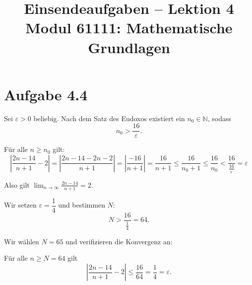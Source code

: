 \documentclass[a4paper,12pt]{article}
\title{Einsendeaufgaben -- Lektion 4\\[0.5em]
\large Modul 61111: Mathematische Grundlagen}
\author{}
\date{}
\begin{document}
\maketitle

\section*{Aufgabe 4.4}

Sei $\varepsilon > 0$ beliebig. Nach dem Satz des Eudoxos existiert ein $n_0 \in \mathbb{N}$, sodass
\[
    n_0 > \frac{16}{\varepsilon}.
\]

F\"{u}r alle $n \geq n_0$ gilt:
\[
    \left| \frac{2n - 14}{n + 1} - 2 \right|
    = \left| \frac{2n - 14 - 2n - 2}{n + 1} \right|
    = \left| \frac{-16}{n + 1} \right|
    = \frac{16}{n + 1}
    \leq \frac{16}{n_0 + 1}
    \leq \frac{16}{n_0}
    < \frac{16}{\frac{16}{\varepsilon}}
    = \varepsilon
\]

Also gilt $\displaystyle\lim_{n \to \infty} \frac{2n - 14}{n + 1} = 2$.

Wir setzen $\varepsilon = \dfrac{1}{4}$ und bestimmen $N$:
\[
    N > \frac{16}{\frac{1}{4}} = 64.
\]

Wir w\"{a}hlen $N = 65$ und verifizieren die Konvergenz an:

F\"{u}r alle $n \geq N = 64$ gilt
\[
    \left| \frac{2n - 14}{n + 1} - 2 \right|
    \leq \frac{16}{64} = \frac{1}{4} = \varepsilon.
\]
\end{document}
